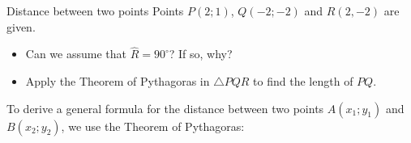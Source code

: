 \begin{Investigation}{Distance between two points}
Points $P(2;1)$, $Q(-2;-2)$ and $R(2,-2)$ are given. 
\begin{itemize}
 \item Can we assume that $\hat{R}=90^{\circ}$? If so, why?
\item Apply the Theorem of Pythagoras in $\triangle PQR$ to find the length of $PQ$.
\end{itemize}


\setcounter{subfigure}{0}
\begin{figure}[H] %
\begin{center}
\end{center}
\label{fig:trianglePQR}
\end{figure} 
\end{Investigation}       
%       
To derive a general formula for the distance between two points $A({x}_{1};{y}_{1})$ and $B({x}_{2};{y}_{2})$, we use the Theorem of Pythagoras:\par 


